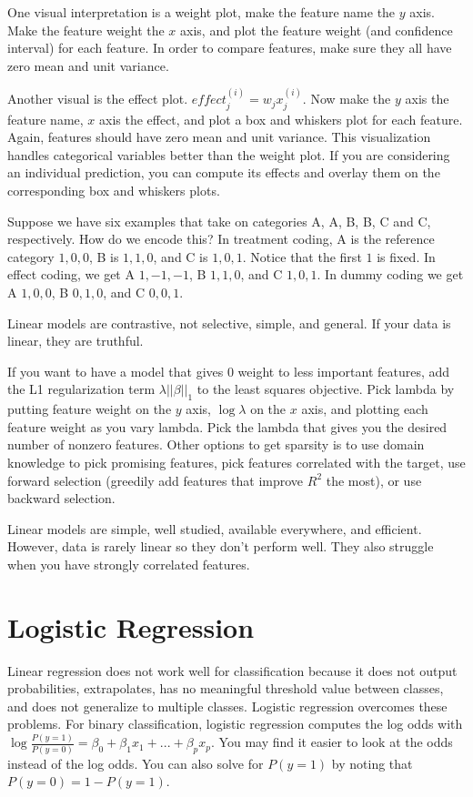 \documentclass[a4paper]{article}
\begin{document}
One visual interpretation is a weight plot, make the feature name the $y$ axis.
Make the feature weight the $x$ axis, and plot the feature weight (and
confidence interval) for each feature. In order to compare features, make sure
they all have zero mean and unit variance.

Another visual is the effect plot. $effect_j^{(i)} = w_j x^{(i)}_j$. Now
make the $y$ axis the feature name, $x$ axis the effect, and plot a box and
whiskers plot for each feature. Again, features should have
zero mean and unit variance. This visualization handles categorical variables
better than the weight plot. If you are considering an individual prediction,
you can compute its effects and overlay them on the corresponding box and
whiskers plots.

Suppose we have six examples that take on categories A, A, B, B, C and C,
respectively. How do we encode this? In treatment coding, A is the reference
category $1, 0, 0$, B is $1, 1, 0$, and C is $1, 0,1$. Notice that the first $1$
is fixed. In effect coding, we get A $1, -1, -1$, B $1, 1, 0$, and C $1, 0, 1$.
In dummy coding we get A $1, 0, 0$, B $0, 1, 0$, and C $0, 0, 1$.

Linear models are contrastive, not selective, simple, and general. If your data
is linear, they are truthful.

If you want to have a model that gives 0 weight to less important features, add
the L1 regularization term $\lambda ||\beta||_1$ to the least squares objective.
Pick lambda by putting feature weight on the $y$ axis, $\log{\lambda}$ on the
$x$ axis, and plotting each feature weight as you vary lambda. Pick the lambda
that gives you the desired number of nonzero features. Other options to get
sparsity is to use domain knowledge to pick promising features, pick features
correlated with the target,
use forward selection (greedily add features that improve $R^2$ the most),
or use backward selection.

Linear models are simple, well studied, available everywhere, and efficient.
However, data is rarely linear so they don't perform well. They also struggle
when you have strongly correlated features.

\section{Logistic Regression}
Linear regression does not work well for classification because it does not
output probabilities, extrapolates, has no meaningful threshold value
between classes, and does not generalize to multiple classes. Logistic
regression overcomes these problems. For binary classification, logistic
regression computes the log odds with $\log{\frac{P(y = 1)}{P(y = 0)}} = \beta_0 +
\beta_1 x_1 + ... + \beta_p x_p$. You may find it easier to look at the odds
instead of the log odds. You can also solve for $P(y = 1)$ by noting that
$P(y = 0) = 1 - P(y = 1)$.
\end{document}
